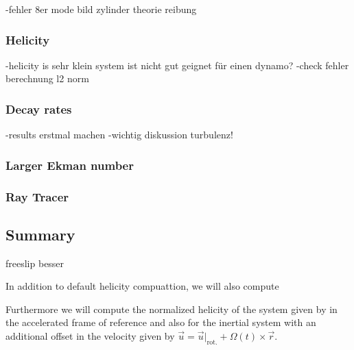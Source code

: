 -fehler 8er mode bild zylinder theorie reibung

\subsubsection{Helicity}

-helicity is sehr klein system ist nicht gut geignet für einen dynamo?
-check fehler berechnung l2 norm

\subsubsection{Decay rates}



-results erstmal machen
-wichtig diskussion turbulenz!

\subsubsection{Larger Ekman number}

\subsubsection{Ray Tracer}


\subsection{Summary}
freeslip besser

In addition to default helicity compuattion, we will also compute

Furthermore we will compute the normalized helicity of the system given by
in the accelerated frame of reference and also for the inertial system with an additional offset in the velocity
given by $\vec{u} = \vec{u}|_{\text{rot.}} + \Omega(t) \times \vec{r}$.
\\
